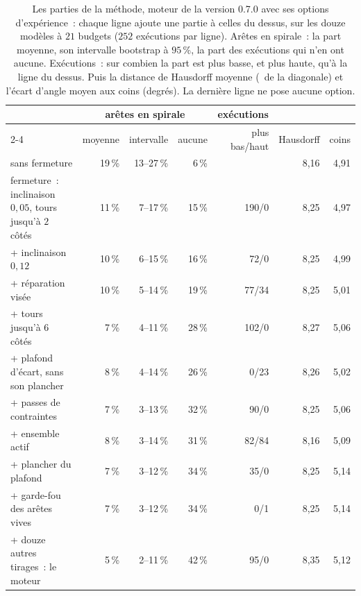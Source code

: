 \documentclass[11pt,a4paper]{article}
\begin{document}
\begin{table}[t]
\centering
\footnotesize
\setlength{\tabcolsep}{3.5pt}
\begin{tabular}{@{}lrrrrrr@{}}
\toprule
& \multicolumn{3}{c}{arêtes en spirale} & \multicolumn{1}{c}{exécutions} & & \\
\cmidrule(lr){2-4}
& moyenne & intervalle & aucune & plus bas/haut & Hausdorff & coins \\
\midrule
sans fermeture & 19\,\% & 13--27\,\% & 6\,\% & & 8,16 & 4,91 \\
fermeture~: inclinaison $0,05$, tours jusqu'à $2$ côtés & 11\,\% & 7--17\,\% & 15\,\% & 190/0 & 8,25 & 4,97 \\
+ inclinaison $0,12$ & 10\,\% & 6--15\,\% & 16\,\% & 72/0 & 8,25 & 4,99 \\
+ réparation visée & 10\,\% & 5--14\,\% & 19\,\% & 77/34 & 8,25 & 5,01 \\
+ tours jusqu'à $6$ côtés & 7\,\% & 4--11\,\% & 28\,\% & 102/0 & 8,27 & 5,06 \\
+ plafond d'écart, sans son plancher & 8\,\% & 4--14\,\% & 26\,\% & 0/23 & 8,26 & 5,02 \\
+ passes de contraintes & 7\,\% & 3--13\,\% & 32\,\% & 90/0 & 8,25 & 5,06 \\
+ ensemble actif & 8\,\% & 3--14\,\% & 31\,\% & 82/84 & 8,16 & 5,09 \\
+ plancher du plafond & 7\,\% & 3--12\,\% & 34\,\% & 35/0 & 8,25 & 5,14 \\
+ garde-fou des arêtes vives & 7\,\% & 3--12\,\% & 34\,\% & 0/1 & 8,25 & 5,14 \\
+ douze autres tirages~: le moteur & 5\,\% & 2--11\,\% & 42\,\% & 95/0 & 8,35 & 5,12 \\
\bottomrule
\end{tabular}
\caption{Les parties de la méthode, moteur de la version 0.7.0 avec ses
options d'expérience~: chaque ligne ajoute une partie à celles du dessus,
sur les douze modèles à $21$ budgets ($252$ exécutions par ligne). Arêtes en
spirale~: la part moyenne, son intervalle bootstrap à $95\,\%$, la part des
exécutions qui n'en ont aucune. Exécutions~: sur combien la part est plus
basse, et plus haute, qu'à la ligne du dessus. Puis la distance de Hausdorff
moyenne (\textperthousand\ de la diagonale) et l'écart d'angle moyen aux coins
(degrés). La dernière ligne ne pose aucune option.}
\label{tab:dev}
\end{table}
\end{document}
